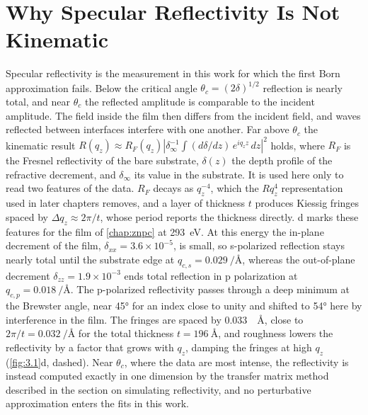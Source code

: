 \section{Why Specular Reflectivity Is Not Kinematic}\label{sec:why-specular-reflectivity-is-not-kinematic}

Specular reflectivity is the measurement in this work for which the first Born approximation fails. Below the critical angle \(\theta_{c} = (2\delta)^{1/2}\) reflection is nearly total, and near \(\theta_{c}\) the reflected amplitude is comparable to the incident amplitude. The field inside the film then differs from the incident field, and waves reflected between interfaces interfere with one another.\autocite{parrattSurfaceStudiesSolids1954} Far above \(\theta_{c}\) the kinematic result \(R\left( q_{z} \right) \approx R_{F}\left( q_{z} \right)\left| \delta_{\infty}^{- 1}\int(d\delta/dz)\, e^{iq_{z}z}\, dz \right|^{2}\) holds, where \(R_{F}\) is the Fresnel reflectivity of the bare substrate, \(\delta(z)\) the depth profile of the refractive decrement, and \(\delta_{\infty}\) its value in the substrate.\autocite{als-nielsenElementsModernXray2011} It is used here only to read two features of the data. \(R_{F}\) decays as \(q_{z}^{- 4}\), which the \(Rq_{z}^{4}\) representation used in later chapters removes, and a layer of thickness \(t\) produces Kiessig fringes spaced by \(\Delta q_{z} \approx 2\pi/t\), whose period reports the thickness directly.\autocite{kiessigInterferenzRontgenstrahlenDunnen1931} d marks these features for the film of \cref{chap:znpc} at \qty{293}{eV}. At this energy the in-plane decrement of the film, \(\delta_{xx} = 3.6 \times 10^{-5}\), is small, so s-polarized reflection stays nearly total until the substrate edge at \(q_{c,s} = \qty{0.029}{\per\angstrom}\), whereas the out-of-plane decrement \(\delta_{zz} = 1.9 \times 10^{-3}\) ends total reflection in p polarization at \(q_{c,p} = \qty{0.018}{\per\angstrom}\). The p-polarized reflectivity passes through a deep minimum at the Brewster angle, near \ang{45} for an index close to unity and shifted to \ang{54} here by interference in the film. The fringes are spaced by \qty{0.033}{\per\angstrom}, close to \(2\pi/t = \qty{0.032}{\per\angstrom}\) for the total thickness \(t = \qty{196}{\angstrom}\), and roughness lowers the reflectivity by a factor that grows with \(q_{z}\), damping the fringes at high \(q_{z}\) (\cref{fig:3.1}d, dashed). Near \(\theta_{c}\), where the data are most intense, the reflectivity is instead computed exactly in one dimension by the transfer matrix method described in the section on simulating reflectivity, and no perturbative approximation enters the fits in this work.

